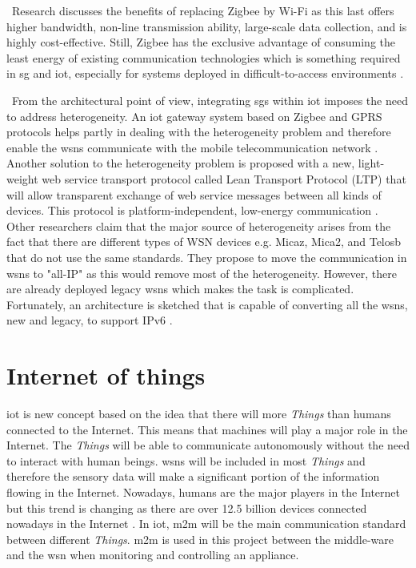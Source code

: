 \documentclass[conference]{IEEEtran}
\begin{document}
\
Research discusses the benefits of replacing Zigbee by Wi-Fi as this last offers higher bandwidth, non-line transmission ability, large-scale data collection, and is highly cost-effective. Still, Zigbee has the exclusive advantage of consuming the least energy of existing communication technologies which is something required in \gls{sg} and \gls{iot}, especially for systems deployed in difficult-to-access environments \cite{ref11}. 

\
From the architectural point of view, integrating \glspl{sg} within \gls{iot} imposes the need to address heterogeneity. An \gls{iot} gateway system based on Zigbee and GPRS protocols helps partly in dealing with the heterogeneity problem and therefore enable the \glspl{wsn} communicate with the mobile telecommunication network \cite{ref11}. Another solution to the heterogeneity problem is proposed with a new, light-weight web service transport protocol called Lean Transport Protocol (LTP) that will allow transparent exchange of web service messages between all kinds of devices. This protocol is platform-independent, low-energy communication \cite{ref12}. Other researchers claim that the major source of heterogeneity arises from the fact that there are different types of WSN devices e.g. Micaz, Mica2, and Telosb that do not use the same standards. They propose to move the communication in \glspl{wsn} to "all-IP" as this would remove most of the heterogeneity. However, there are already deployed legacy \glspl{wsn} which makes the task is complicated. Fortunately, an architecture is sketched that is capable of converting all the \glspl{wsn}, new and legacy, to support IPv6 \cite{ref13}.

\section{Internet of things}
\gls{iot} is new concept based on the idea that there will more \textit{Things} than humans connected to the Internet. This means that machines will play a major role in the Internet. The \textit{Things} will be able to communicate autonomously without the need to interact with human beings. \glspl{wsn} will be included in most \textit{Things} and therefore the sensory data will make a significant portion of the information flowing in the Internet. Nowadays, humans are the major players in the Internet but this trend is changing as there are over 12.5 billion devices connected nowadays in the Internet \cite{ref14}. In \gls{iot}, \gls{m2m} will be the main communication standard between different \textit{Things}. \gls{m2m} is used in this project between the middle-ware and the \gls{wsn} when monitoring and controlling an appliance. 
\end{document}
